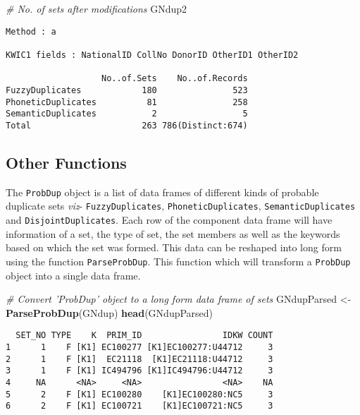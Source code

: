 \documentclass[
]{article}
\newenvironment{Shaded}{\begin{snugshade}}{\end{snugshade}}
\newcommand{\CommentTok}[1]{\textcolor[rgb]{0.56,0.35,0.01}{\textit{#1}}}
\newcommand{\KeywordTok}[1]{\textcolor[rgb]{0.13,0.29,0.53}{\textbf{#1}}}
\newcommand{\NormalTok}[1]{#1}
\newcommand{\StringTok}[1]{\textcolor[rgb]{0.31,0.60,0.02}{#1}}
\begin{document}
\begin{Shaded}
\begin{Highlighting}[]
\CommentTok{# No. of sets after modifications}
\NormalTok{GNdup2}
\end{Highlighting}
\end{Shaded}

\begin{verbatim}
Method : a

KWIC1 fields : NationalID CollNo DonorID OtherID1 OtherID2
 
                   No..of.Sets    No..of.Records
FuzzyDuplicates            180               523
PhoneticDuplicates          81               258
SemanticDuplicates           2                 5
Total                      263 786(Distinct:674)
\end{verbatim}

\hypertarget{other-functions}{%
\subsection{Other Functions}\label{other-functions}}

The \texttt{ProbDup} object is a list of data frames of different kinds
of probable duplicate sets \emph{viz}- \texttt{FuzzyDuplicates},
\texttt{PhoneticDuplicates}, \texttt{SemanticDuplicates} and
\texttt{DisjointDuplicates}. Each row of the component data frame will
have information of a set, the type of set, the set members as well as
the keywords based on which the set was formed. This data can be
reshaped into long form using the function \texttt{ParseProbDup}. This
function which will transform a \texttt{ProbDup} object into a single
data frame.

\begin{Shaded}
\begin{Highlighting}[]
\CommentTok{# Convert 'ProbDup' object to a long form data frame of sets}
\NormalTok{GNdupParsed <-}\StringTok{ }\KeywordTok{ParseProbDup}\NormalTok{(GNdup)}
\KeywordTok{head}\NormalTok{(GNdupParsed)}
\end{Highlighting}
\end{Shaded}

\begin{verbatim}
  SET_NO TYPE    K  PRIM_ID                IDKW COUNT
1      1    F [K1] EC100277 [K1]EC100277:U44712     3
2      1    F [K1]  EC21118  [K1]EC21118:U44712     3
3      1    F [K1] IC494796 [K1]IC494796:U44712     3
4     NA      <NA>     <NA>                <NA>    NA
5      2    F [K1] EC100280    [K1]EC100280:NC5     3
6      2    F [K1] EC100721    [K1]EC100721:NC5     3
\end{verbatim}
\end{document}
